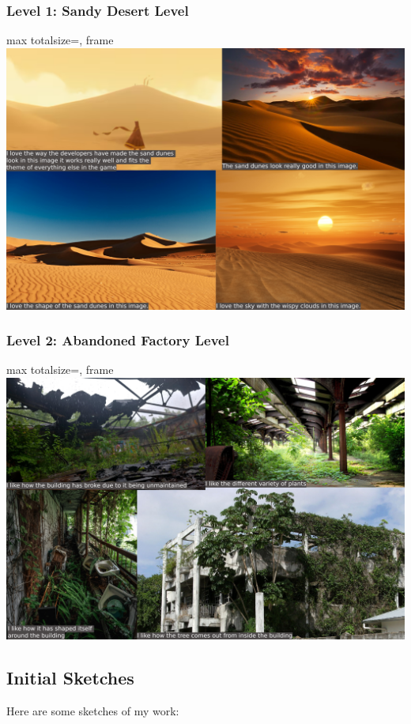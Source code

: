 \documentclass[12pt]{article}
\begin{document}
	\subsubsection{Level 1: Sandy Desert Level}
	\begin{adjustbox}{%
    	max totalsize={\linewidth}{\textheight},
    	frame
	}
		\includegraphics{desertMoodboard.png} 
	\end{adjustbox}
	
	\subsubsection{Level 2: Abandoned Factory Level}
	\begin{adjustbox}{%
    	max totalsize={\linewidth}{\textheight},
    	frame
	}
		\includegraphics{factoryMoodBoard.png} 
	\end{adjustbox}
	
	\subsection{Initial Sketches}
	Here are some sketches of my work:
	
\end{document}
